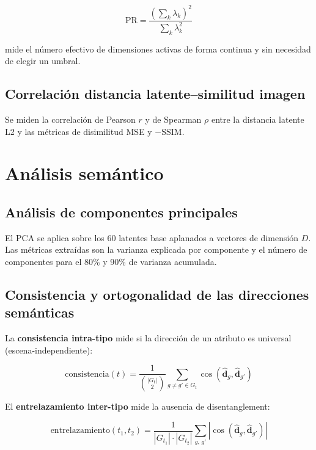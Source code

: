 \documentclass[12pt, a4paper, twoside]{book}
\begin{document}
\begin{equation}
\text{PR} = \frac{\left(\sum_k \lambda_k\right)^2}{\sum_k \lambda_k^2}
\end{equation}

mide el número efectivo de dimensiones activas de forma continua y sin necesidad de elegir un umbral.

\subsection{Correlación distancia latente--similitud imagen}

Se miden la correlación de Pearson $r$ y de Spearman $\rho$ entre la distancia latente L2 y las métricas de disimilitud MSE y $-\text{SSIM}$.

\section{Análisis semántico}
\label{sec:metodos:semantico}

\subsection{Análisis de componentes principales}

El PCA se aplica sobre los 60 latentes base aplanados a vectores de dimensión $D$. Las métricas extraídas son la varianza explicada por componente y el número de componentes para el 80\% y 90\% de varianza acumulada.

\subsection{Consistencia y ortogonalidad de las direcciones semánticas}

La \textbf{consistencia intra-tipo} mide si la dirección de un atributo es universal (escena-independiente):

\begin{equation}
\text{consistencia}(t) = \frac{1}{\binom{|G_t|}{2}} \sum_{g \neq g' \in G_t} \cos\!\left(\hat{\mathbf{d}}_g, \hat{\mathbf{d}}_{g'}\right)
\end{equation}

El \textbf{entrelazamiento inter-tipo} mide la ausencia de disentanglement:

\begin{equation}
\text{entrelazamiento}(t_1, t_2) = \frac{1}{|G_{t_1}| \cdot |G_{t_2}|}
\sum_{g,\, g'} \left|\cos\!\left(\hat{\mathbf{d}}_g, \hat{\mathbf{d}}_{g'}\right)\right|
\end{equation}
\end{document}

